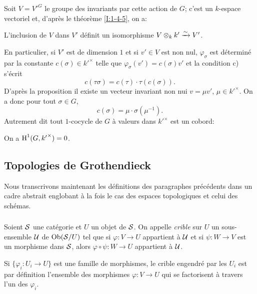 \documentclass[oneside]{book}
\begin{document}
Soit $V={V'}^G$ le groupe des invariants par cette action de $G$; c'est un 
$k$-espace vectoriel et, d'après le théorème \ref{I:1-4-5}, on a:

\begin{proposition}\label{I:1-5-2}
L'inclusion de $V$ dans $V'$ définit un isomorphisme 
$V\otimes_k k' \xrightarrow\sim V'$.
\end{proposition}

En particulier, si $V'$ est de dimension $1$ et si $v'\in V$ est non nul, 
$\varphi_\sigma$ est déterminé par la constante 
$c(\sigma)\in {k'}^\times$ telle que $\varphi_\sigma(v')=c(\sigma)v'$ et la 
condition c) s'écrit 
\[
  c(\tau\sigma) = c(\tau)\cdot \tau(c(\sigma))\text{.}
\]
D'après la proposition il existe un vecteur invariant non nui 
$v=\mu v'$, $\mu\in {k'}^\times$. On a donc pour tout $\sigma\in G$, 
\[
  c(\sigma) = \mu\cdot \sigma(\mu^{-1})\text{.}
\]
Autrement dit tout $1$-cocycle de $G$ à valeurs dans ${k'}^\times$ est un 
cobord: 

\begin{corollary}\label{I:1-5-3}
On a $\operatorname{H}^1(G,{k'}^\times)=0$.
\end{corollary}










\subsection{Topologies de Grothendieck}\label{I:1-6}

Nous transcrivons maintenant les définitions des paragraphes précédents 
dans un cadre abstrait englobant à la fois le cas des espaces topologiques 
et celui des schémas. 





\subsubsection{}\label{I:1-6-1}

Soient $\mathcal{S}$ une catégorie et $U$ un objet de $\mathcal{S}$. On appelle \emph{crible} 
sur $U$ un sous-ensemble $\mathcal{U}$ de $\operatorname{Ob}(\mathcal{S}/U)$ tel que si $\varphi:V\to U$ 
appartient à $\mathcal{U}$ et si $\psi:W\to V$ est un morphisme dans $\mathcal{S}$, alors 
$\varphi\circ\psi:W\to U$ appartient à $\mathcal{U}$. 

Si $\{\varphi_i:U_i\to U\}$ est une famille de morphismes, le crible 
engendré par les $U_i$ est par définition l'ensemble des morphismes 
$\varphi:V\to U$ qui se factorisent à travers l'un des $\varphi_i$. 
\end{document}
